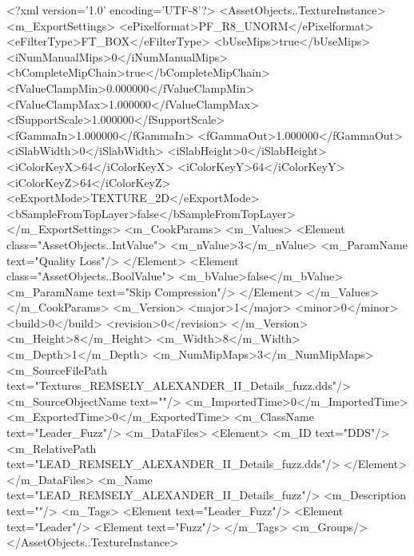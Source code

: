 <?xml version='1.0' encoding='UTF-8'?>
<AssetObjects..TextureInstance>
  <m_ExportSettings>
    <ePixelformat>PF_R8_UNORM</ePixelformat>
    <eFilterType>FT_BOX</eFilterType>
    <bUseMips>true</bUseMips>
    <iNumManualMips>0</iNumManualMips>
    <bCompleteMipChain>true</bCompleteMipChain>
    <fValueClampMin>0.000000</fValueClampMin>
    <fValueClampMax>1.000000</fValueClampMax>
    <fSupportScale>1.000000</fSupportScale>
    <fGammaIn>1.000000</fGammaIn>
    <fGammaOut>1.000000</fGammaOut>
    <iSlabWidth>0</iSlabWidth>
    <iSlabHeight>0</iSlabHeight>
    <iColorKeyX>64</iColorKeyX>
    <iColorKeyY>64</iColorKeyY>
    <iColorKeyZ>64</iColorKeyZ>
    <eExportMode>TEXTURE_2D</eExportMode>
    <bSampleFromTopLayer>false</bSampleFromTopLayer>
  </m_ExportSettings>
  <m_CookParams>
    <m_Values>
      <Element class="AssetObjects..IntValue">
        <m_nValue>3</m_nValue>
        <m_ParamName text="Quality Loss"/>
      </Element>
      <Element class="AssetObjects..BoolValue">
        <m_bValue>false</m_bValue>
        <m_ParamName text="Skip Compression"/>
      </Element>
    </m_Values>
  </m_CookParams>
  <m_Version>
    <major>1</major>
    <minor>0</minor>
    <build>0</build>
    <revision>0</revision>
  </m_Version>
  <m_Height>8</m_Height>
  <m_Width>8</m_Width>
  <m_Depth>1</m_Depth>
  <m_NumMipMaps>3</m_NumMipMaps>
  <m_SourceFilePath text="Textures\LEAD_REMSELY_ALEXANDER_II_Details_fuzz.dds"/>
  <m_SourceObjectName text=""/>
  <m_ImportedTime>0</m_ImportedTime>
  <m_ExportedTime>0</m_ExportedTime>
  <m_ClassName text="Leader_Fuzz"/>
  <m_DataFiles>
    <Element>
      <m_ID text="DDS"/>
      <m_RelativePath text="LEAD_REMSELY_ALEXANDER_II_Details_fuzz.dds"/>
    </Element>
  </m_DataFiles>
  <m_Name text="LEAD_REMSELY_ALEXANDER_II_Details_fuzz"/>
  <m_Description text=""/>
  <m_Tags>
    <Element text="Leader_Fuzz"/>
    <Element text="Leader"/>
    <Element text="Fuzz"/>
  </m_Tags>
  <m_Groups/>
</AssetObjects..TextureInstance>
